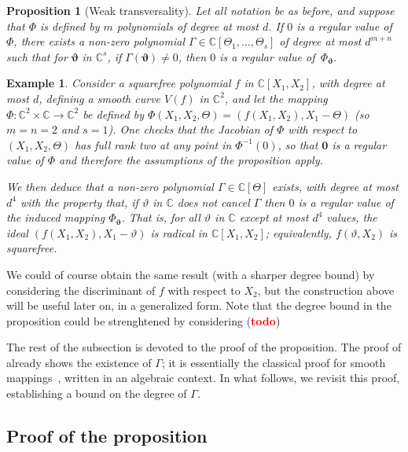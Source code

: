 \documentclass[12pt]{article}
\def\bz{{{\bm 0}}}
\def\thetab{\bm{\vartheta}}
\def\vt{\vartheta}
\def\dt{s}
\def\C{\mathbb{C}}
\def\td{(\textcolor{red}{{\bf todo}})}
\newtheorem{ex}[theorem]{Example}
\newtheorem{prop}[theorem]{Proposition}
\begin{document}
\begin{prop} [Weak transversality]\label{prop:weak_t}
  Let all notation be as before, and suppose that $\Phi$ is defined by
  $m$ polynomials of degree at most $d$. If $0$ is a regular value of
  $\Phi$, there exists a non-zero polynomial $\Gamma \in
  \C[\Theta_1,\dots,\Theta_s]$ of degree at most $d^{m+n}$ such that
  for $\thetab$ in $\C^\dt$, if $\Gamma(\thetab)\ne 0$, then $0$ is a
  regular value of~$\Phi_{\thetab}$.
\end{prop}
\begin{ex}
  Consider a squarefree polynomial $f$ in $\C[X_1,X_2]$, with degree
  at most $d$, defining a smooth curve $V(f)$ in $\C^2$, and let the
  mapping $\Phi:\C^2\times \C \to \C^2$ be defined by
  $\Phi(X_1,X_2,\Theta) = (f(X_1,X_2), X_1-\Theta)$ (so $m=n=2$ and
  $s=1$). One checks that the Jacobian of $\Phi$ with respect to
  $(X_1,X_2,\Theta)$ has full rank two at any point in $\Phi^{-1}(0)$,
  so that $\bz$ is a regular value of $ \Phi$ and therefore the
  assumptions of the proposition apply.

  We then deduce that a non-zero polynomial $\Gamma \in \C[\Theta]$
  exists, with degree at most $d^{4}$ with the property that, if
  $\vartheta$ in $\C$ does not cancel $\Gamma$ then $0$ is a regular
  value of the induced mapping $ \Phi_{\bm \vt}$. That is, for all
  $\vartheta$ in $\C$ except at most $d^4$ values, the ideal
  $(f(X_1,X_2), X_1-\vartheta)$ is radical in $\C[X_1,X_2]$;
  equivalently, $f(\vartheta, X_2)$ is squarefree.
\end{ex}
We could of course obtain the same result (with a sharper degree
bound) by considering the discriminant of $f$ with respect to $X_2$,
but the construction above will be useful later on, in a generalized
form. Note that the degree bound in the proposition could be
strenghtened by considering \td

The rest of the subsection is devoted to the proof of the proposition.
The proof of \cite[Theorem B.3]{TWT} already shows the existence of
$\Gamma$; it is essentially the classical proof for smooth
mappings~\cite[Section~3.7]{demazure2000bifurcations}, written in an
algebraic context. In what follows, we revisit this proof,
establishing a bound on the degree of $\Gamma$.


\subsection{Proof of the proposition}
\end{document}
